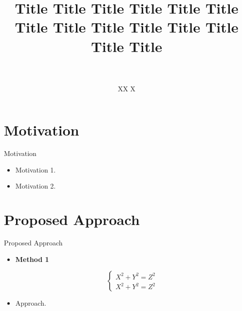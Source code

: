 \documentclass[11pt]{beamer}
\title{Title Title Title Title Title Title Title Title Title Title Title Title Title Title}
\author{\quad\\\quad\\XX X}
\institute{University XXX}
\date{}%
\begin{document}
\begin{frame}
\titlepage
\end{frame}
\section[Outline]{}


\section{Motivation}
\begin{frame}{Motivation}
\begin{itemize}
[ball]
\item Motivation 1.
\item Motivation 2.
\end{itemize}
\end{frame}

\section{Proposed Approach}
\begin{frame}{Proposed Approach}
\setcounter{equation}{0}

\begin{itemize}
[ball]
\item {\bf Method 1}

\begin{mdframed}[backgroundcolor=anti-flashwhite,hidealllines=true]
\begin{equation}\label{residualdeepmodel2}
\left\{\begin{array}{l}
X^2+Y^2=Z^2\\
X^2+Y^2=Z^2
\end{array}\right.
\end{equation}
\end{mdframed}
\end{itemize}

\vskip -0.2in
\begin{mdframed}[backgroundcolor=blond,hidealllines=true]
\begin{itemize}
[ball] 
\item Approach.
\end{itemize}
 
\end{mdframed}

\end{frame}
\end{document}
